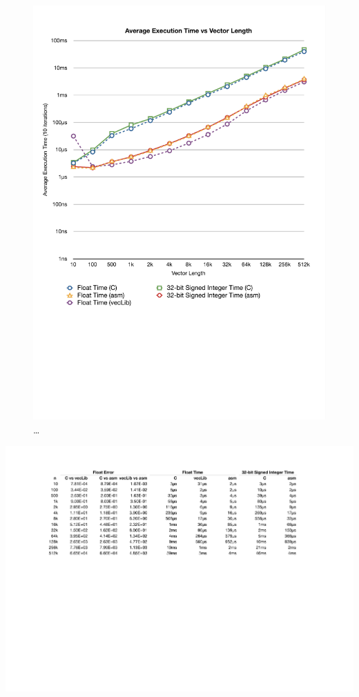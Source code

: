 \documentclass[oneside,a4paper]{report}
\begin{document}
\begin{figure}[htb]
	\centering
	\includegraphics[width=1.0\textwidth]{./fig/ResultsChart.pdf}
	\caption{\ldots}
	\label{fig:results}
\end{figure}

\begin{table}[htb]
	\centering
	\includegraphics[width=1.0\textwidth]{./fig/ResultsTable.pdf}
	\caption{\ldots}
	\label{tab:results}
\end{table}
\end{document}
